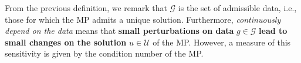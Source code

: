 \noindent
From the previous definition, we remark that $\mathcal{G}$ is the set of admissible data, i.e., those for which the MP admits a unique solution. Furthermore, \emph{continuously depend on the data} means that \textbf{small perturbations on data} $g \in \mathcal{G}$ \textbf{lead to small changes on the solution} $u \in \mathcal{U}$ of the MP. However, a measure of this sensitivity is given by the condition number of the MP.